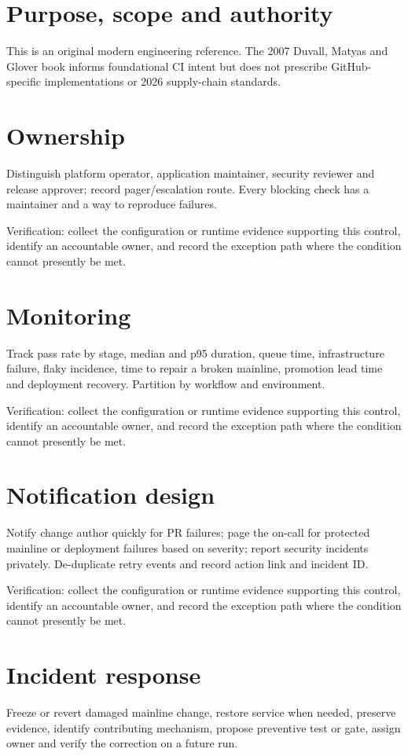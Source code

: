 \documentclass[11pt,letterpaper]{article}
\begin{document}
\makedoctitle
\makedocsummary
\tableofcontents
\clearpage
\section{Purpose, scope and authority}
This is an original modern engineering reference. The 2007 Duvall, Matyas and Glover book informs foundational CI intent but does not prescribe GitHub-specific implementations or 2026 supply-chain standards.

\section{Ownership}
Distinguish platform operator, application maintainer, security reviewer and release approver; record pager/escalation route. Every blocking check has a maintainer and a way to reproduce failures.

Verification: collect the configuration or runtime evidence supporting this control, identify an accountable owner, and record the exception path where the condition cannot presently be met.

\section{Monitoring}
Track pass rate by stage, median and p95 duration, queue time, infrastructure failure, flaky incidence, time to repair a broken mainline, promotion lead time and deployment recovery. Partition by workflow and environment.

Verification: collect the configuration or runtime evidence supporting this control, identify an accountable owner, and record the exception path where the condition cannot presently be met.

\section{Notification design}
Notify change author quickly for PR failures; page the on-call for protected mainline or deployment failures based on severity; report security incidents privately. De-duplicate retry events and record action link and incident ID.

Verification: collect the configuration or runtime evidence supporting this control, identify an accountable owner, and record the exception path where the condition cannot presently be met.

\section{Incident response}
Freeze or revert damaged mainline change, restore service when needed, preserve evidence, identify contributing mechanism, propose preventive test or gate, assign owner and verify the correction on a future run.
\end{document}
